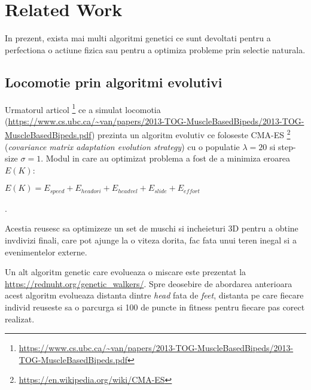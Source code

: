 \chapter{Related Work}

In prezent, exista mai multi algoritmi genetici ce sunt devoltati pentru a perfectiona o actiune fizica sau pentru a optimiza probleme prin selectie naturala. 
\section{Locomotie prin algoritmi evolutivi}

Urmatorul articol \footnote{\url{https://www.cs.ubc.ca/~van/papers/2013-TOG-MuscleBasedBipeds/2013-TOG-MuscleBasedBipeds.pdf}} ce a simulat locomotia (\url{https://www.cs.ubc.ca/~van/papers/2013-TOG-MuscleBasedBipeds/2013-TOG-MuscleBasedBipeds.pdf}) prezinta un algoritm evolutiv ce foloseste CMA-ES \footnote{\url{https://en.wikipedia.org/wiki/CMA-ES}} (\textit{covariance matrix adaptation evolution strategy}) cu o populatie $\lambda = 20$ si step-size $\sigma = 1$. Modul in care au optimizat problema a fost de a minimiza eroarea $E(K)$:\begin{center} $E(K) = E_{speed} + E_{headori}+ E_{headvel}+ E_{slide}+ E_{effort}$ \end{center}.


Acestia reusesc sa optimizeze un set de muschi si incheieturi 3D pentru a obtine invdivizi finali, care pot ajunge la o viteza dorita, fac fata unui teren inegal si a evenimentelor externe.

Un alt algoritm genetic care evolueaza o miscare este prezentat la \url{https://rednuht.org/genetic_walkers/}. Spre deosebire de abordarea anterioara acest algoritm evolueaza distanta dintre \textit{head} fata de \textit{feet}, distanta pe care fiecare individ reuseste sa o parcurga si 100 de puncte in fitness pentru fiecare pas corect realizat.